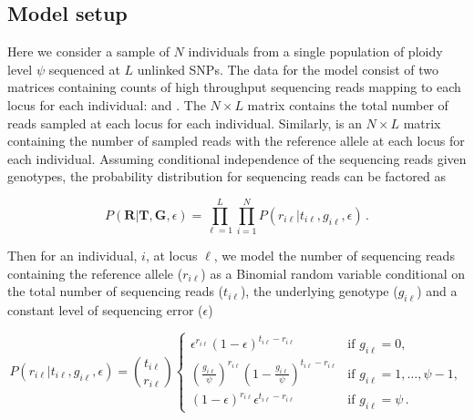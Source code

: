 \documentclass[11pt,english,letterpaper,oneside]{article}
\begin{document}
\medskip
\subsection*{Model setup}
\medskip

Here we consider a sample of $N$ individuals from a single population of ploidy level $\psi$ sequenced at $L$ unlinked SNPs. The data for the model consist of two matrices containing counts of high throughput sequencing reads mapping to each locus for each individual: \rmat{} and \tmat. The $N \times L$ matrix \tmat{} contains the total number of reads sampled at each locus for each individual. Similarly, \rmat{} is an $N \times L$ matrix containing the number of sampled reads with the reference allele at each locus for each individual. Assuming conditional independence of the sequencing reads given genotypes, the probability distribution for sequencing reads can be factored as

\begin{equation}\label{factored_lik}
P(\bm{R}|\bm{T},\bm{G}, \epsilon) = \displaystyle\prod_{\ell=1}^L\displaystyle\prod_{i=1}^N P(r_{i \ell}|t_{i \ell},g_{i \ell}, \epsilon)\,.
\end{equation}

\noindent Then for an individual, $i$, at locus $\ell$, we model the number of sequencing reads containing the reference allele ($r_{i\ell}$) as a Binomial random variable conditional on the total number of sequencing reads ($t_{i\ell} $), the underlying genotype ($g_{i\ell}$) and a constant level of sequencing error ($\epsilon$)

\begin{equation}\label{likelihood}
P(r_{i \ell}|t_{i\ell}, g_{i \ell},\epsilon) = \binom{t_{i \ell}}{r_{i \ell}}
	\begin{cases}
	\epsilon^{r_{i \ell}}(1-\epsilon)^{t_{i \ell}-r_{i \ell}} & \text{if  } g_{i \ell} = 0, \\[0.05in]
	\left(\frac{g_{i \ell}}{\psi}\right)^{r_{i \ell}}\left(1-\frac{g_{i \ell}}{\psi}\right)^{t_{i \ell}-r_{i \ell}} & \text{if  } g_{i \ell} = 1,\ldots,\psi-1, \\[0.05in]
	(1-\epsilon)^{r_{i \ell}}\epsilon^{t_{i \ell}-r_{i \ell}} & \text{if  } g_{i \ell} = \psi\,.
	\end{cases}
\end{equation}
\end{document}

